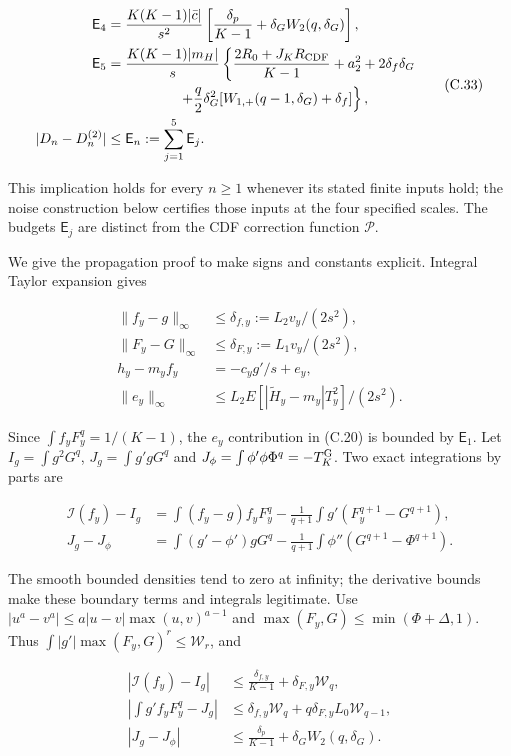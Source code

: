 \documentclass{article}
\begin{document}
\[
\begin{aligned}
\mathsf E_4&=\frac{K(K-1)|\bar c|}{s^2}
\left[\frac{\delta_p}{K-1}+\delta_GW_2(q,\delta_G)\right],\\
\mathsf E_5&=\frac{K(K-1)|m_H|}{s}\left\{
\frac{2R_0+J_KR_{\rm CDF}}{K-1}+a_2^2+2\delta_f\delta_G\right.\\
&\hspace{18mm}\left.+\frac q2\delta_G^2[W_{1,+}(q-1,\delta_G)+\delta_f]\right\},\\
|D_n-D_n^{(2)}|&\le\mathsf E_n:=\sum_{j=1}^5\mathsf E_j.
\end{aligned}
\tag{C.33}
\]

This implication holds for every \(n\ge1\) whenever its stated finite
inputs hold; the noise construction below certifies those inputs at the
four specified scales. The budgets \(\mathsf E_j\) are distinct from the
CDF correction function \(\mathcal P\).

We give the propagation proof to make signs and constants explicit.
Integral Taylor expansion gives

\[
\begin{aligned}
\|f_y-g\|_\infty&\le\delta_{f,y}:=L_2v_y/(2s^2),\\
\|F_y-G\|_\infty&\le\delta_{F,y}:=L_1v_y/(2s^2),\\
h_y-m_yf_y&=-c_yg'/s+e_y,\\
\|e_y\|_\infty&\le L_2E[|\widetilde H_y-m_y|T_y^2]/(2s^2).
\end{aligned}
\tag{C.34}
\]

Since \(\int f_yF_y^q=1/(K-1)\), the \(e_y\) contribution in (C.20) is
bounded by \(\mathsf E_1\). Let \(I_g=\int g^2G^q\), \(J_g=\int g'gG^q\)
and \(J_\phi=\int\phi'\phi\Phi^q=-T_K^{\rm G}\). Two exact integrations
by parts are

\[
\begin{aligned}
\mathcal I(f_y)-I_g
&=\int(f_y-g)f_yF_y^q
-\frac1{q+1}\int g'(F_y^{q+1}-G^{q+1}),\\
J_g-J_\phi
&=\int(g'-\phi')gG^q
-\frac1{q+1}\int\phi''(G^{q+1}-\Phi^{q+1}).
\end{aligned}
\tag{C.35}
\]

The smooth bounded densities tend to zero at infinity; the derivative
bounds make these boundary terms and integrals legitimate. Use
\(|u^a-v^a|\le a|u-v|\max(u,v)^{a-1}\) and
\(\max(F_y,G)\le\min(\Phi+\Delta,1)\). Thus
\(\int|g'|\max(F_y,G)^r\le\mathcal W_r\), and

\[
\begin{aligned}
|\mathcal I(f_y)-I_g|&\le\frac{\delta_{f,y}}{K-1}+\delta_{F,y}\mathcal W_q,\\
\left|\int g'f_yF_y^q-J_g\right|
&\le\delta_{f,y}\mathcal W_q+q\delta_{F,y}L_0\mathcal W_{q-1},\\
|J_g-J_\phi|&\le\frac{\delta_p}{K-1}+\delta_GW_2(q,\delta_G).
\end{aligned}
\tag{C.36}
\]
\end{document}
